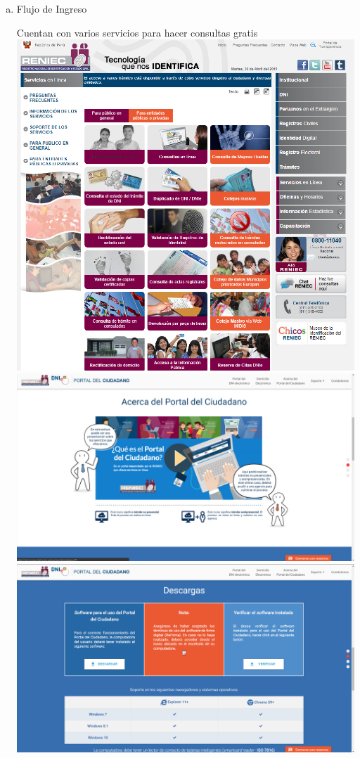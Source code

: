 \begin{enumerate}[1.]
\begin{enumerate}[a)]
\begin{center}
                    \end{center}
\item Flujo de Ingreso \\
 \begin{center}
Cuentan con varios servicios para hacer consultas gratis
                    \includegraphics[scale=0.30]{./Imagenes/e.png}
\includegraphics[scale=0.30]{./Imagenes/e1.png}
\includegraphics[scale=0.30]{./Imagenes/e2.png}

\end{center}
\end{enumerate}
\end{enumerate}
